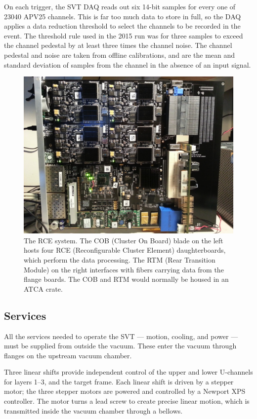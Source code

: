 On each trigger, the SVT DAQ reads out six 14-bit samples for every one of 23040 APV25 channels.
This is far too much data to store in full, so the DAQ applies a data reduction threshold to select the channels to be recorded in the event.
The threshold rule used in the 2015 run was for three samples to exceed the channel pedestal by at least three times the channel noise.
The channel pedestal and noise are taken from offline calibrations, and are the mean and standard deviation of samples from the channel in the absence of an input signal.

\begin{figure}[htp]
    \includegraphics[width=\textwidth]{detector/figs/rce}
    \caption{The RCE system. The COB (Cluster On Board) blade on the left hosts four RCE (Reconfigurable Cluster Element) daughterboards, which perform the data processing. The RTM (Rear Transition Module) on the right interfaces with fibers carrying data from the flange boards. The COB and RTM would normally be housed in an ATCA crate.}
    \label{fig:rce}
\end{figure}

\subsection{Services}
\label{sec:svt_services}
All the services needed to operate the SVT --- motion, cooling, and power --- must be supplied from outside the vacuum.
These enter the vacuum through flanges on the upstream vacuum chamber.

Three linear shifts provide independent control of the upper and lower U-channels for layers 1--3, and the target frame.
Each linear shift is driven by a stepper motor; the three stepper motors are powered and controlled by a Newport XPS controller.
The motor turns a lead screw to create precise linear motion, which is transmitted inside the vacuum chamber through a bellows.

